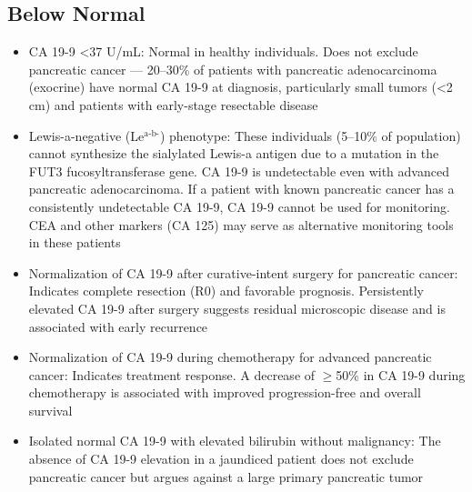 \subsection*{Below Normal}
\begin{itemize}
  \item CA 19-9 <37 U/mL: Normal in healthy individuals. Does not exclude pancreatic cancer --- 20--30\% of patients with pancreatic adenocarcinoma (exocrine) have normal CA 19-9 at diagnosis, particularly small tumors (<2 cm) and patients with early-stage resectable disease
  \item Lewis-a-negative (Le$^\text{a-b-}$) phenotype: These individuals (5--10\% of population) cannot synthesize the sialylated Lewis-a antigen due to a mutation in the FUT3 fucosyltransferase gene. CA 19-9 is undetectable even with advanced pancreatic adenocarcinoma. If a patient with known pancreatic cancer has a consistently undetectable CA 19-9, CA 19-9 cannot be used for monitoring. CEA and other markers (CA 125) may serve as alternative monitoring tools in these patients
  \item Normalization of CA 19-9 after curative-intent surgery for pancreatic cancer: Indicates complete resection (R0) and favorable prognosis. Persistently elevated CA 19-9 after surgery suggests residual microscopic disease and is associated with early recurrence
  \item Normalization of CA 19-9 during chemotherapy for advanced pancreatic cancer: Indicates treatment response. A decrease of $\geq$50\% in CA 19-9 during chemotherapy is associated with improved progression-free and overall survival
  \item Isolated normal CA 19-9 with elevated bilirubin without malignancy: The absence of CA 19-9 elevation in a jaundiced patient does not exclude pancreatic cancer but argues against a large primary pancreatic tumor
\end{itemize}

